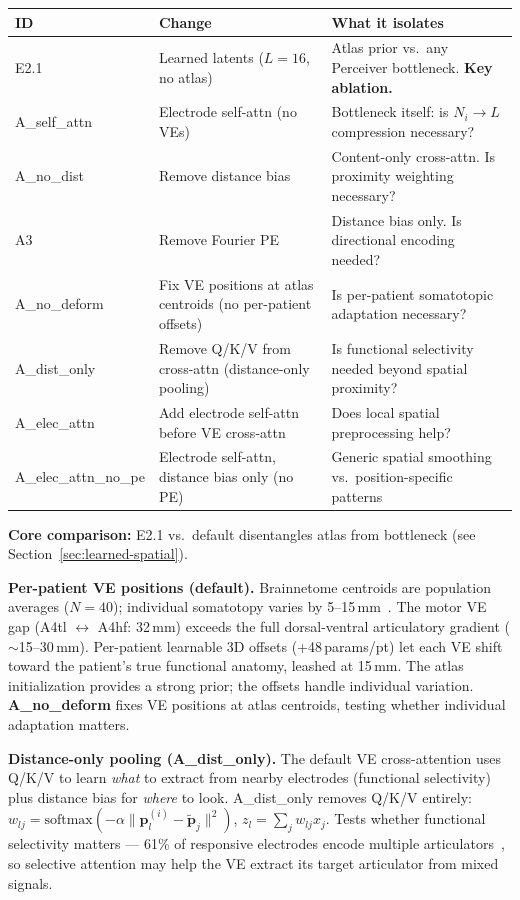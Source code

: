 \documentclass[11pt,letterpaper]{article}
\newcommand{\bfp}{\mathbf{p}}
\begin{document}
\begin{table}[ht!]\centering\small
\begin{tabular}{@{}llp{5.5cm}@{}}
\toprule
\textbf{ID} & \textbf{Change} & \textbf{What it isolates} \\
\midrule
E2.1 & Learned latents ($L{=}16$, no atlas) & Atlas prior vs.\ any Perceiver bottleneck. \textbf{Key ablation.} \\
A\_self\_attn & Electrode self-attn (no VEs) & Bottleneck itself: is $N_i \to L$ compression necessary? \\
A\_no\_dist & Remove distance bias & Content-only cross-attn. Is proximity weighting necessary? \\
A3 & Remove Fourier PE & Distance bias only. Is directional encoding needed? \\
A\_no\_deform & Fix VE positions at atlas centroids (no per-patient offsets) & Is per-patient somatotopic adaptation necessary? \\
A\_dist\_only & Remove Q/K/V from cross-attn (distance-only pooling) & Is functional selectivity needed beyond spatial proximity? \\
A\_elec\_attn & Add electrode self-attn before VE cross-attn & Does local spatial preprocessing help? \\
A\_elec\_attn\_no\_pe & Electrode self-attn, distance bias only (no PE) & Generic spatial smoothing vs.\ position-specific patterns \\
\bottomrule
\end{tabular}
\end{table}

\textbf{Core comparison:} E2.1 vs.\ default disentangles atlas from bottleneck (see Section~\ref{sec:learned-spatial}).

\textbf{Per-patient VE positions (default).} Brainnetome centroids are population averages ($N{=}40$); individual somatotopy varies by 5--15\,mm~\cite{roux2020,eichert2020}. The motor VE gap (A4tl $\leftrightarrow$ A4hf: 32\,mm) exceeds the full dorsal-ventral articulatory gradient (${\sim}$15--30\,mm). Per-patient learnable 3D offsets (+48\,params/pt) let each VE shift toward the patient's true functional anatomy, leashed at 15\,mm. The atlas initialization provides a strong prior; the offsets handle individual variation. \textbf{A\_no\_deform} fixes VE positions at atlas centroids, testing whether individual adaptation matters.

\textbf{Distance-only pooling (A\_dist\_only).} The default VE cross-attention uses Q/K/V to learn \textit{what} to extract from nearby electrodes (functional selectivity) plus distance bias for \textit{where} to look. A\_dist\_only removes Q/K/V entirely: $w_{lj} = \text{softmax}(-\alpha \|\bfp_l^{(i)} - \tilde{\bfp}_j\|^2)$, $z_l = \sum_j w_{lj} x_j$. Tests whether functional selectivity matters --- 61\% of responsive electrodes encode multiple articulators~\cite{conant2018}, so selective attention may help the VE extract its target articulator from mixed signals.
\end{document}
